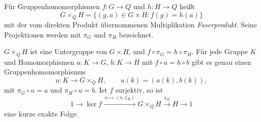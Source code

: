 \begin{definition}
\label{b40guide:def:pullback}
Für Gruppenhomomorphismen $f:G\to Q$ und $h:H\to Q$ heißt
\[
 G\times_Q H=\{(g,a)\in G\times H:f(g)=h(a)\}
\]
mit der vom direkten Produkt übernommenen Multiplikation
\emph{Faserprodukt}. Seine Projektionen werden mit $\pi_G$ und $\pi_H$
bezeichnet.
\end{definition}

\begin{theorem}
\label{b40guide:thm:pullback-universal}
$G\times_QH$ ist eine Untergruppe von $G\times H$, und
$f\circ\pi_G=h\circ\pi_H$.
Für jede Gruppe $K$ und Homomorphismen $a:K\to G$, $b:K\to H$
mit $f\circ a=h\circ b$ gibt es genau einen Gruppenhomomorphismus
\[
 u:K\longrightarrow G\times_QH,\qquad u(k)=(a(k),b(k)),
\]
mit $\pi_G\circ u=a$ und $\pi_H\circ u=b$.
Ist $f$ surjektiv, so ist
\[
 1\longrightarrow\ker f\xrightarrow{\,n\mapsto(n,1_H)\,}
 G\times_QH\xrightarrow{\pi_H}H\longrightarrow1
\]
eine kurze exakte Folge.
\cite{milne}
\end{theorem}